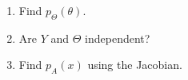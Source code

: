 \begin{enumerate}[label=\thesubsection.\arabic*.,ref=\thesubsection.\theenumi]
%
%
\item
Find $p_{\Theta}(\theta)$.  

%
\item
Are $Y$ and $\Theta$ independent?

\item
Find $p_{A}(x)$ using the Jacobian.

%
%

%
%
%
\end{enumerate}
